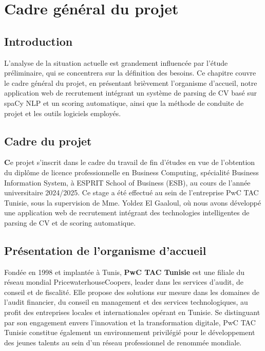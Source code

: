 
\chapter{ Cadre général du projet }

\setcounter{mtc}{2}
\minitoc

\newpage
\section*{Introduction}

\par L'analyse de la situation actuelle est grandement influencée par l'étude préliminaire, qui se concentrera sur la définition des besoins. Ce chapitre couvre le cadre général du projet, en présentant brièvement l'organisme d'accueil, notre application web de recrutement intégrant un système de parsing de CV basé sur spaCy NLP et un scoring automatique, ainsi que la méthode de conduite de projet et les outils logiciels employés.

\vspace*{-0.5cm}

\section{Cadre du projet}
\hspace{0.5cm} \textbf Ce projet s'inscrit dans le cadre du travail de fin d'études en vue de l'obtention du diplôme de licence professionnelle en Business Computing, spécialité Business Information System, à ESPRIT School of Business (ESB), au cours de l'année universitaire 2024/2025. Ce stage a été effectué au sein de l'entreprise PwC TAC Tunisie, sous la supervision de Mme. Yoldez El Gaaloul, où nous avons développé une application web de recrutement intégrant des technologies intelligentes de parsing de CV et de scoring automatique.
\vspace*{-0.5cm}

\section{Présentation de l'organisme d'accueil}
Fondée en 1998 et implantée à Tunis, \textbf{PwC TAC Tunisie} est une filiale du réseau mondial PricewaterhouseCoopers, leader dans les services d'audit, de conseil et de fiscalité. Elle propose des solutions sur mesure dans les domaines de l'audit financier, du conseil en management et des services technologiques, au profit des entreprises locales et internationales opérant en Tunisie. Se distinguant par son engagement envers l'innovation et la transformation digitale, PwC TAC Tunisie constitue également un environnement privilégié pour le développement des jeunes talents au sein d'un réseau professionnel de renommée mondiale.

